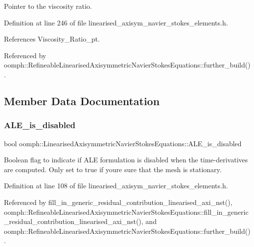 Pointer to the viscosity ratio. 



Definition at line 246 of file linearised\+\_\+axisym\+\_\+navier\+\_\+stokes\+\_\+elements.\+h.



References Viscosity\+\_\+\+Ratio\+\_\+pt.



Referenced by oomph\+::\+Refineable\+Linearised\+Axisymmetric\+Navier\+Stokes\+Equations\+::further\+\_\+build().



\subsection{Member Data Documentation}
\mbox{\label{classoomph_1_1LinearisedAxisymmetricNavierStokesEquations_a7bd074159223ffae0b106db776b670eb}} 
\subsubsection{\texorpdfstring{A\+L\+E\+\_\+is\+\_\+disabled}{ALE\_is\_disabled}}
{\footnotesize\ttfamily bool oomph\+::\+Linearised\+Axisymmetric\+Navier\+Stokes\+Equations\+::\+A\+L\+E\+\_\+is\+\_\+disabled\hspace{0.3cm}{\ttfamily [protected]}}



Boolean flag to indicate if A\+LE formulation is disabled when the time-\/derivatives are computed. Only set to true if you\textquotesingle{}re sure that the mesh is stationary. 



Definition at line 108 of file linearised\+\_\+axisym\+\_\+navier\+\_\+stokes\+\_\+elements.\+h.



Referenced by fill\+\_\+in\+\_\+generic\+\_\+residual\+\_\+contribution\+\_\+linearised\+\_\+axi\+\_\+nst(), oomph\+::\+Refineable\+Linearised\+Axisymmetric\+Navier\+Stokes\+Equations\+::fill\+\_\+in\+\_\+generic\+\_\+residual\+\_\+contribution\+\_\+linearised\+\_\+axi\+\_\+nst(), and oomph\+::\+Refineable\+Linearised\+Axisymmetric\+Navier\+Stokes\+Equations\+::further\+\_\+build().

